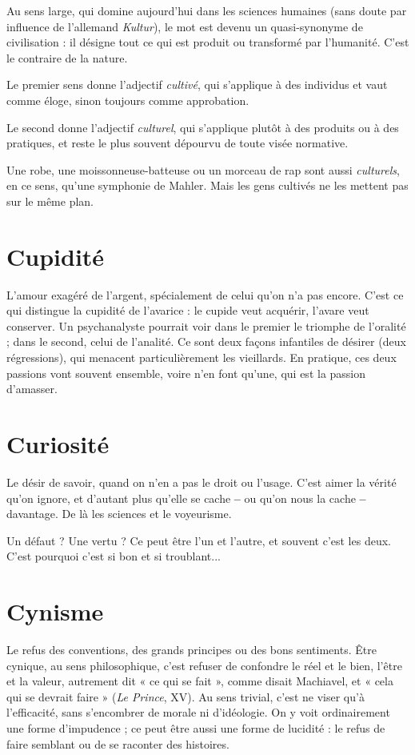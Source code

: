 Au sens large, qui domine aujourd’hui dans les sciences humaines (sans
doute par influence de l'allemand {\it Kultur}), le mot est devenu un quasi-synonyme
de civilisation : il désigne tout ce qui est produit ou transformé par
l’humanité. C’est le contraire de la nature.

Le premier sens donne l'adjectif {\it cultivé}, qui s'applique à des individus et
vaut comme éloge, sinon toujours comme approbation.

Le second donne l’adjectif {\it culturel}, qui s'applique plutôt à des produits ou
à des pratiques, et reste le plus souvent dépourvu de toute visée normative.

Une robe, une moissonneuse-batteuse ou un morceau de rap sont aussi {\it culturels},
en ce sens, qu’une symphonie de Mahler. Mais les gens cultivés ne les
mettent pas sur le même plan.

\section{Cupidité}
L'amour exagéré de l’argent, spécialement de celui qu’on n’a
pas encore. C’est ce qui distingue la cupidité de l’avarice : le
cupide veut acquérir, l’avare veut conserver. Un psychanalyste pourrait voir
dans le premier le triomphe de l’oralité ; dans le second, celui de l’analité. Ce
sont deux façons infantiles de désirer (deux régressions), qui menacent
particulièrement les vieillards.
En pratique, ces deux passions vont souvent ensemble, voire n’en font
qu’une, qui est la passion d’amasser.

\section{Curiosité}
Le désir de savoir, quand on n’en a pas le droit ou l’usage.
C’est aimer la vérité qu’on ignore, et d’autant plus qu’elle se
cache {\bf --} ou qu’on nous la cache {\bf --} davantage. De là les sciences et le voyeurisme.

Un défaut ? Une vertu ? Ce peut être l’un et l’autre, et souvent c’est les
deux. C’est pourquoi c’est si bon et si troublant...

\section{Cynisme}
Le refus des conventions, des grands principes ou des bons sentiments.
Être cynique, au sens philosophique, c’est refuser de
confondre le réel et le bien, l'être et la valeur, autrement dit « ce qui se fait »,
comme disait Machiavel, et « cela qui se devrait faire » ({\it Le Prince}, XV). Au sens
trivial, c’est ne viser qu’à l'efficacité, sans s’encombrer de morale ni d’idéologie.
On y voit ordinairement une forme d’impudence ; ce peut être aussi une forme
de lucidité : le refus de faire semblant ou de se raconter des histoires.

